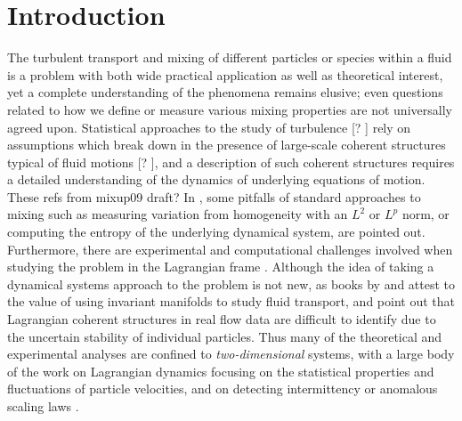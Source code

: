 

\section{Introduction}
\label{s:intro}

The turbulent transport and mixing of different particles or species 
within a fluid is a problem with both wide practical application as well 
as theoretical interest, yet a complete understanding of the phenomena 
remains elusive; even questions related to how we define or measure 
various mixing properties are not universally agreed upon. Statistical approaches to the study of turbulence [? ] rely on assumptions
 which break down in the presence of large-scale coherent structures typical of
 fluid motions [? ], and a description of such coherent structures requires a detailed
 understanding of the dynamics of underlying equations of motion. 
  {These refs from mixup09 draft?}
 In 
\citet{MaMPe05}, some pitfalls of standard approaches to mixing such as measuring 
variation from homogeneity with an $L^2$ or $L^p$ norm, or computing the 
entropy of the underlying dynamical system, are pointed out. Furthermore, 
there are experimental and computational challenges involved when 
studying the problem in the Lagrangian frame 
\citep{MHPRS07,ABBBBB08,BrLiEc06,MoLePi04}. Although the idea of taking a 
dynamical systems approach to the problem is not new, as books by 
\citet{Botti89} and %
\citet{Wiggins1992} attest to the value of
using invariant manifolds to study fluid transport, \citet{MHPRS07} and 
\citet{Haller02} point out that Lagrangian coherent structures in 
real flow data are difficult to identify due to the uncertain stability 
of individual particles. Thus many of the theoretical and experimental 
analyses are confined to \emph{two-dimensional} systems, with a large 
body of the work on Lagrangian dynamics focusing on the statistical 
properties and fluctuations of particle velocities, and on detecting 
intermittency or anomalous scaling laws 
\citep{EgeChi22,MoLePi04,ABBBBB08,FaGaVe01}. 


